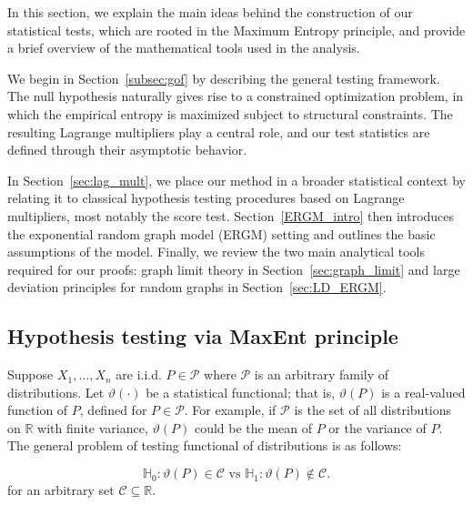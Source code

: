 \documentclass[12pt]{article}
\def\H{\mathbb{H}}
\numberwithin{equation}{section}
\begin{document}
In this section, we explain the main ideas behind the construction of our statistical tests, which are rooted in the Maximum Entropy principle, and provide a brief overview of the mathematical tools used in the analysis. 

We begin in Section~\ref{subsec:gof} by describing the general testing framework. The null hypothesis naturally gives rise to a constrained optimization problem, in which the empirical entropy is maximized subject to structural constraints. The resulting Lagrange multipliers play a central role, and our test statistics are defined through their asymptotic behavior.

In Section~\ref{sec:lag_mult}, we place our method in a broader statistical context by relating it to classical hypothesis testing procedures based on Lagrange multipliers, most notably the score test. Section~\ref{ERGM_intro} then introduces the exponential random graph model (ERGM) setting and outlines the basic assumptions of the model. Finally, we review the two main analytical tools required for our proofs: graph limit theory in Section~\ref{sec:graph_limit} and large deviation principles for random graphs in Section~\ref{sec:LD_ERGM}.

\subsection{Hypothesis testing via MaxEnt principle}{\label{subsec:gof}}

Suppose $X_1,\ldots,X_n$ are i.i.d. $P\in \mathcal P$ where $\mathcal P$ is an arbitrary family of distributions.
Let $\vartheta(\cdot)$ be a statistical functional; that is, $\vartheta(P)$ is a real-valued function of $P$, defined for $P \in \mathcal P$. For example, if $\mathcal P$ is the set of all distributions on $\mathbb{R}$ with finite variance, $\vartheta(P)$ could be the mean of $P$ or the variance of $P$. The general problem of testing functional of distributions is as follows:

\begin{equation}
\H_0: \vartheta(P)\in \mathcal{C} \text{ vs } \H_1: \vartheta(P)\notin \mathcal{C}. \label{functional testing}
\end{equation}
for an arbitrary set $\mathcal C\subseteq \mathbb{R}$.
\end{document}
